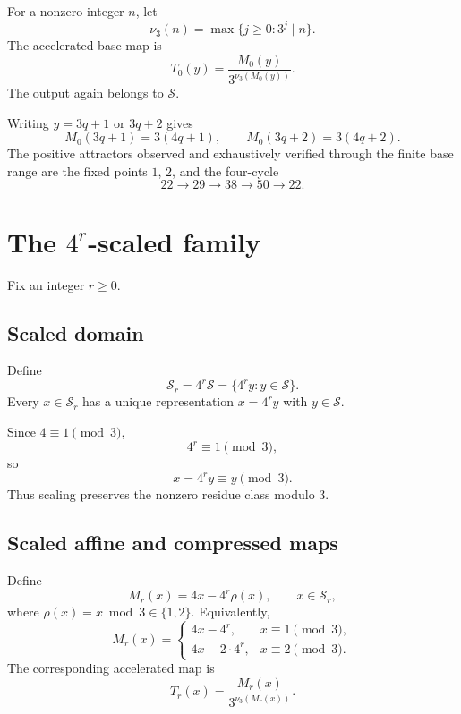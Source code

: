 \documentclass[11pt]{article}
\newcommand{\vthree}{\nu_3}
\newcommand{\Sbase}{\mathcal S}
\newcommand{\Sr}{\mathcal S_r}
\newcommand{\rhoo}{\rho}
\begin{document}
For a nonzero integer $n$, let
\[
\vthree(n)=\max\{j\ge0:3^j\mid n\}.
\]
The accelerated base map is
\begin{equation}
T_0(y)=\frac{M_0(y)}{3^{\vthree(M_0(y))}}.
\label{eq:baseT}
\end{equation}
The output again belongs to $\Sbase$.

Writing $y=3q+1$ or $3q+2$ gives
\[
M_0(3q+1)=3(4q+1),\qquad
M_0(3q+2)=3(4q+2).
\]
The positive attractors observed and exhaustively verified through the finite base range are the fixed points $1$, $2$, and the four-cycle
\begin{equation}
22\longrightarrow29\longrightarrow38\longrightarrow50\longrightarrow22.
\label{eq:basecycle}
\end{equation}

\section{The $4^r$-scaled family}
Fix an integer $r\ge0$.

\subsection{Scaled domain}
Define
\begin{equation}
\Sr=4^r\Sbase=\{4^r y:y\in\Sbase\}.
\label{eq:Sr}
\end{equation}
Every $x\in\Sr$ has a unique representation $x=4^r y$ with $y\in\Sbase$.

Since $4\equiv1\pmod3$,
\begin{equation}
4^r\equiv1\pmod3,
\end{equation}
so
\begin{equation}
x=4^r y\equiv y\pmod3.
\label{eq:respres}
\end{equation}
Thus scaling preserves the nonzero residue class modulo $3$.

\subsection{Scaled affine and compressed maps}
Define
\begin{equation}
M_r(x)=4x-4^r\rhoo(x),\qquad x\in\Sr,
\label{eq:Mr}
\end{equation}
where $\rhoo(x)=x\bmod3\in\{1,2\}$. Equivalently,
\begin{equation}
M_r(x)=
\begin{cases}
4x-4^r,&x\equiv1\pmod3,\\
4x-2\cdot4^r,&x\equiv2\pmod3.
\end{cases}
\label{eq:scaledbranches}
\end{equation}
The corresponding accelerated map is
\begin{equation}
T_r(x)=\frac{M_r(x)}{3^{\vthree(M_r(x))}}.
\label{eq:Tr}
\end{equation}
\end{document}

